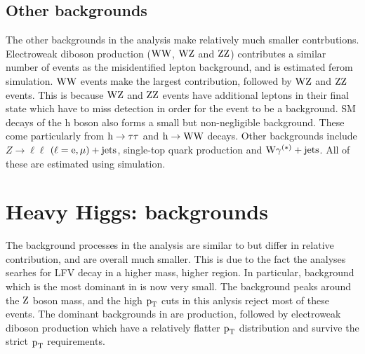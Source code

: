 \subsection{Other backgrounds}
\label{h125_other_bg}
The other backgrounds in the analysis make relatively much smaller contrbutions. Electroweak diboson production ($\text{W}\text{W}$, $\text{W}\text{Z}$ and $\text{Z}\text{Z}$) contributes a similar number of events as the misidentified lepton background, and is estimated ferom simulation. $\text{W}\text{W}$ events make the largest contribution, followed by $\text{W}\text{Z}$ and $\text{Z}\text{Z}$ events. This is because $\text{W}\text{Z}$ and $\text{Z}\text{Z}$ events  have additional leptons in their final state which have to miss detection in order for the event to be a background. SM decays of the h boson also forms a small but non-negligible background. These come particularly from $\text{h} \to \tau\tau$  and $\text{h} \to \text{W}\text{W}$ decays. Other backgrounds include $Z\to\ell\ell$ $(\ell = \text{e}, \mu)+\text{jets}$, single-top quark production and $\text{W}\gamma^{(*)}+\text{jets}$. All of these are estimated using simulation.  

\section{Heavy Higgs: \Hmue backgrounds }
\label{H_bg_val}
The background processes in the \Hmue analysis are  similar  to \hmue but differ in relative contribution, and are overall much smaller. This is due to the fact the \Hmue analyses searhes for LFV decay in a higher mass, higher \pt region. In particular, \ztt background which is the most dominant in \hmue is now very small. The \ztt background peaks around the $\text{Z}$ boson mass, and the  high $\text{p}_\text{T}$ cuts in this anlysis reject most of these events. The dominant backgrounds in \Hmue are \ttb production, followed by electroweak diboson production which have a relatively flatter $\text{p}_\text{T}$ distribution and survive the strict $\text{p}_\text{T}$ requirements.

